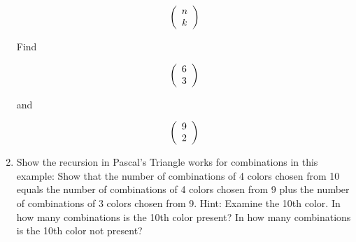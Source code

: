 \documentclass[number]{ximera}
\begin{document}
\begin{enumerate}
\[
\left( {\begin{array}{*{20}c}
n \\
k\\
\end{array}} \right)
\]

Find 

\[
\left( {\begin{array}{*{20}c}
6 \\
3 \\
\end{array}} \right)
\]

and  

\[
\left( {\begin{array}{*{20}c}
9 \\
2 \\
\end{array}} \right)
\]

\item

Show the recursion in Pascal's Triangle works for combinations in this example: Show that the number of combinations of 4 colors chosen from 10 equals the number of combinations of 4 colors chosen from 9 plus the number of combinations of 3 colors chosen from 9. Hint: Examine the 10th color. In how many combinations is the 10th color present? In how many combinations is the 10th color not present?

\end{enumerate}
\end{document}
